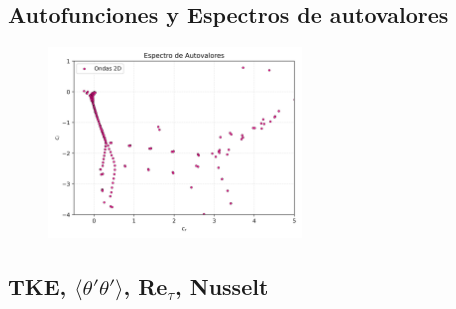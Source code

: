 \subsection{Autofunciones y Espectros de autovalores}

\begin{figure}[H]
  \centering
  \caption{}
  \label{fig:eigenfuns1-Re5000-Pr0071}
\end{figure}


\begin{figure}[H]
  \centering
    \includegraphics[width=0.6\textwidth]{figures/cap6/Re5000-Pr071-Ri1Em3/Re5000-Pr071-Ri1Em3_eigenvals.png}
  \caption{}
  \label{fig:spectra-Re5000-Pr0071}
\end{figure}


\subsection{TKE, $\langle \theta' \theta' \rangle$, Re$_{\tau}$, Nusselt }

